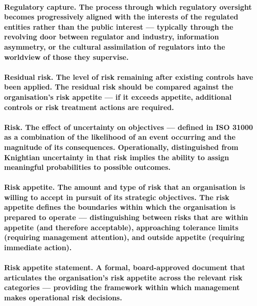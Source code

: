 \paragraph{\textbf{Regulatory capture}. The process through which regulatory oversight becomes progressively aligned with the interests of the regulated entities rather than the public interest — typically through the revolving door between regulator and industry, information asymmetry, or the cultural assimilation of regulators into the worldview of those they supervise.}

\paragraph{\textbf{Residual risk}. The level of risk remaining after existing controls have been applied. The residual risk should be compared against the organisation's risk appetite — if it exceeds appetite, additional controls or risk treatment actions are required.}

\paragraph{\textbf{Risk}. The effect of uncertainty on objectives — defined in ISO 31000 as a combination of the likelihood of an event occurring and the magnitude of its consequences. Operationally, distinguished from Knightian uncertainty in that risk implies the ability to assign meaningful probabilities to possible outcomes.}

\paragraph{\textbf{Risk appetite}. The amount and type of risk that an organisation is willing to accept in pursuit of its strategic objectives. The risk appetite defines the boundaries within which the organisation is prepared to operate — distinguishing between risks that are within appetite (and therefore acceptable), approaching tolerance limits (requiring management attention), and outside appetite (requiring immediate action).}

\paragraph{\textbf{Risk appetite statement}. A formal, board-approved document that articulates the organisation's risk appetite across the relevant risk categories — providing the framework within which management makes operational risk decisions.}

